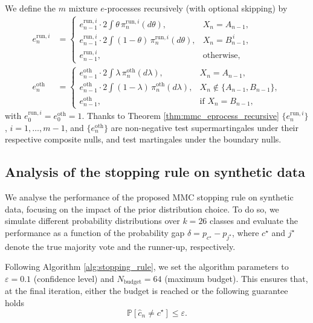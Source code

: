We define the $m$ mixture $e$-processes recursively (with optional skipping) by
\begin{align*}
e^{\mathrm{run}, i}_n
&=\begin{cases}
e^{\mathrm{run}, i}_{n-1}\cdot 2\!\displaystyle\int \theta\,\pi^{\mathrm{run}, i}_n(d\theta), & X_n = A_{n-1},\\[1mm]
e^{\mathrm{run}, i}_{n-1}\cdot 2\!\displaystyle\int (1-\theta)\,\pi^{\mathrm{run}, i}_n(d\theta), & X_n = B_{n-1}^{\, i},\\[1mm]
e^{\mathrm{run}, i}_{n-1}, & \text{otherwise,}
\end{cases}\\[2mm]
e^{\mathrm{oth}}_n
&=\begin{cases}
e^{\mathrm{oth}}_{n-1}\cdot 2\!\displaystyle\int \lambda\,\pi^{\mathrm{oth}}_n(d\lambda), & X_n = A_{n-1},\\[1mm]
e^{\mathrm{oth}}_{n-1}\cdot 2\!\displaystyle\int (1-\lambda)\,\pi^{\mathrm{oth}}_n(d\lambda), & X_n \notin \{A_{n-1},B_{n-1}\},\\[1mm]
e^{\mathrm{oth}}_{n-1}, & \text{if } X_n = B_{n-1},
\end{cases}
\end{align*}
with $e^{\mathrm{run}, i}_0=e^{\mathrm{oth}}_0=1$.
Thanks to Theorem \ref{thm:mmc_eprocess_recursive} $\{e^{\mathrm{run}, i}_n\}$, $i=1, \dots, m-1$, and $\{e^{\mathrm{oth}}_n\}$ are
non-negative test supermartingales under their respective composite nulls, and test martingales under the boundary nulls.

\subsection{Analysis of the stopping rule on synthetic data}\label{app:subsec_mmc_synthetic_data}
We analyse the performance of the proposed MMC stopping rule on synthetic data, focusing on the impact of the prior distribution choice.
To do so, we simulate different probability distributions over
$k=26$ classes and evaluate the performance as a function of the probability gap $\delta=p_{c^\star}- p_{j^\star}$, where $c^\star$ and $j^\star$ denote the true majority vote and the runner-up, respectively. 

Following Algorithm \ref{alg:stopping_rule}, we set the algorithm parameters to $\varepsilon=0.1$ (confidence level) and $N_{\text{budget}}=64$ (maximum budget).
This ensures that, at the final iteration, either the budget is reached or the following guarantee holds
$$
\mathbb{P}\left[\widehat{c}_n\neq c^\star\right]\leq \varepsilon.
$$

